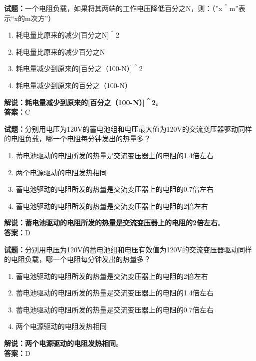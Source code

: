 \documentclass{ctexbook}
\begin{document}
\bigskip


\noindent\textbf{试题：}一个电阻负载，如果将其两端的工作电压降低百分之N，则：（”x＾m”表示“x的m次方”）
\begin{enumerate}[leftmargin=3em]
\item 耗电量比原来的减少[百分之N]＾2
\item 耗电量比原来的减少百分之N
\item 耗电量减少到原来的[百分之（100-N）]＾2
\item 耗电量减少到原来的百分之（100-N）
\end{enumerate}
\noindent\textbf{解说：}\textbf{耗电量减少到原来的[百分之（100-N）]＾2}。\\\noindent\textbf{答案：}C




\bigskip


\noindent\textbf{试题：}分别用电压为120V的蓄电池组和电压最大值为120V的交流变压器驱动同样的电阻负载，哪一个电阻每分钟发出的热量多？
\begin{enumerate}[leftmargin=3em]
\item 蓄电池驱动的电阻所发的热量是交流变压器上的电阻的1.4倍左右
\item 两个电源驱动的电阻发热相同
\item 蓄电池驱动的电阻所发的热量是交流变压器上的电阻的0.7倍左右
\item 蓄电池驱动的电阻所发的热量是交流变压器上的电阻的2倍左右
\end{enumerate}
\noindent\textbf{解说：}\textbf{蓄电池驱动的电阻所发的热量是交流变压器上的电阻的2倍左右}。\\\noindent\textbf{答案：}D



\bigskip


\noindent\textbf{试题：}分别用电压为120V的蓄电池组和电压有效值为120V的交流变压器驱动同样的电阻负载，哪一个电阻每分钟发出的热量多？
\begin{enumerate}[leftmargin=3em]
\item 蓄电池驱动的电阻所发的热量是交流变压器上的电阻的2倍左右
\item 蓄电池驱动的电阻所发的热量是交流变压器上的电阻的1.4倍左右
\item 蓄电池驱动的电阻所发的热量是交流变压器上的电阻的0.7倍左右
\item 两个电源驱动的电阻发热相同
\end{enumerate}
\noindent\textbf{解说：}\textbf{两个电源驱动的电阻发热相同}。\\\noindent\textbf{答案：}D
\end{document}
